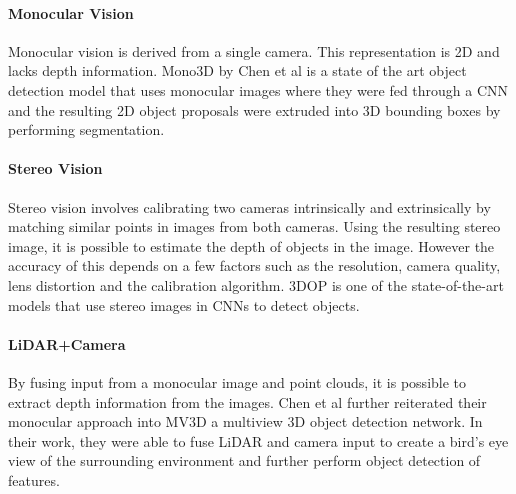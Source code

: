 \paragraph{Monocular Vision} 
Monocular vision is derived from a single camera. This representation is 2D and lacks depth information. Mono3D by Chen et al \cite{chen2016monocular} is a state of the art object detection model that uses monocular images where they were fed through a CNN and the resulting 2D object proposals were extruded into 3D bounding boxes by performing segmentation.

\paragraph{Stereo Vision}Stereo vision involves calibrating two cameras intrinsically and extrinsically by matching similar points in images from both cameras. Using the resulting stereo image, it is possible to estimate the depth of objects in the image. However the accuracy of this depends on a few factors such as the resolution, camera quality, lens distortion and the calibration algorithm. 3DOP \cite{chen20183d} is one of the state-of-the-art models that use stereo images in CNNs to detect objects.  

\paragraph{LiDAR+Camera}
By fusing input from a monocular image and point clouds, it is possible to extract depth information from the images. Chen et al further reiterated their monocular approach into MV3D\cite{chen2017multi} a multiview 3D object detection network. In their work, they were able to fuse LiDAR and camera input to create a bird's eye view of the surrounding environment and further perform object detection of features. 


